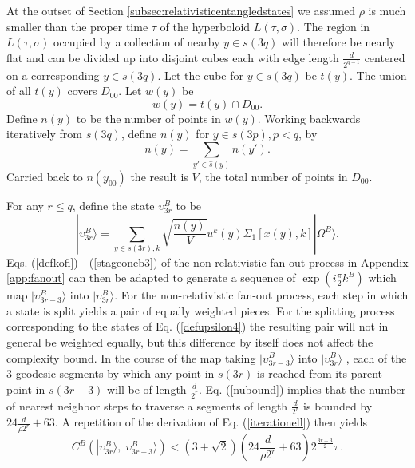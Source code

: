 \documentclass[12pt,amsmath,amssymb,onecolumn]{revtex4-2}
\begin{document}
At the outset of Section \ref{subsec:relativisticentangledstates} we assumed $\rho$ is much
smaller than the proper time $\tau$ of the hyperboloid $L( \tau, \sigma)$.
The region in $L( \tau, \sigma)$ occupied by a collection of nearby $y \in s(3q)$ will
therefore be
nearly flat and can
be divided up into disjoint cubes each with edge length $\frac{d}{2^{q-1}}$ centered on a
corresponding $y \in s(3q)$. Let the cube for $y \in s(3q)$ be
$t(y)$. The union of all $t(y)$ covers $D_{00}$. Let $w(y)$ be 
\begin{equation}
  \label{defwy}
  w(y) = t(y) \cap D_{00}.
\end{equation}
Define $n(y)$ to be the number of points in $w(y)$. Working backwards iteratively from $s(3q)$,
define $n(y)$ for $y \in s(3p), p < q$, by
\begin{equation}
  \label{defbarwy}
  n(y) = \sum_{y' \in \hat{s}(y)} n(y').
\end{equation}
Carried back to $n(y_{00})$ the result is $V$, the total
number of points in $D_{00}$.

For any $r \le q$, define the state $\upsilon^B_{3r}$ to be
\begin{equation}
\label{defupsilon4}
|\upsilon^B_{3r} \rangle  = \sum_{y \in s(3r), k}\sqrt{ \frac{n(y)}{V}} u^k(y) \Sigma_1[x( y), k] |\Omega^B \rangle .
\end{equation}
Eqs. (\ref{defkofi}) - (\ref{stageoneb3}) of 
the non-relativistic
fan-out process in Appendix \ref{app:fanout} can then be adapted to
generate a sequence of $\exp( i \frac{\pi}{2} k^B)$ which map 
$|\upsilon^B_{3r-3} \rangle $ into $|\upsilon^B_{3r} \rangle $.
For the non-relativistic fan-out process, each 
step in which a state is split yields 
a pair of equally weighted pieces. For the splitting
process corresponding to the states of Eq. (\ref{defupsilon4}) the
resulting pair will not in general be weighted equally, but
this difference by itself does not affect the complexity bound.
In the course of the map taking $|\upsilon^B_{3r-3} \rangle $ into $|\upsilon^B_{3r} \rangle $ , each of the 3
geodesic segments by which any point in $s(3r)$ is reached
from its parent point in $s(3r - 3)$ will
be of length $\frac{d}{2^r}$. 
Eq. (\ref{nubound}) implies that the number of nearest neighbor
steps to traverse a segments of length $\frac{d}{2^r}$ is
bounded by $ 24 \frac{d}{\rho 2^r} + 63$.
A repetition of the derivation of Eq. (\ref{iterationell}) 
then yields
\begin{equation}
\label{iterationellr}
C^B( |\upsilon^B_{3 r} \rangle , |\upsilon^B_{3 r - 3} \rangle ) < (3+\sqrt{2})( 24 \frac{d}{\rho 2^r} + 63) 2^{\frac{3r-3}{2}} \pi.
\end{equation}
\end{document}
